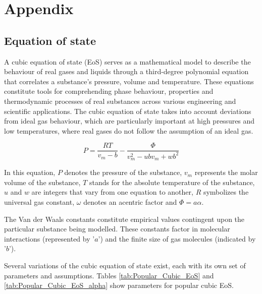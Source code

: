 \documentclass[a4paper,fleqn]{cas-dc}
\begin{document}
\clearpage \appendix \label{appendix}
\section{Appendix} 

\label{CH: Thermodynamic_details}

\subsection{Equation of state} \label{subsubsec: Equation of state}

A cubic equation of state (EoS) serves as a mathematical model to describe the behaviour of real gases and liquids through a third-degree polynomial equation that correlates a substance's pressure, volume and temperature. These equations constitute tools for comprehending phase behaviour, properties and thermodynamic processes of real substances across various engineering and scientific applications. The cubic equation of state takes into account deviations from ideal gas behaviour, which are particularly important at high pressures and low temperatures, where real gases do not follow the assumption of an ideal gas.

{\footnotesize
	\begin{equation}
		P = \frac{RT}{v_m-b} - \frac{\Phi}{v_m^2 - ubv_m + wb^2}
	\end{equation}
}

In this equation, $P$ denotes the pressure of the substance, $v_m$ represents the molar volume of the substance, $T$ stands for the absolute temperature of the substance, $u$ and $w$ are integers that vary from one equation to another, $R$ symbolizes the universal gas constant, $\omega$ denotes an acentric factor and $\Phi=a\alpha$.

The Van der Waals constants constitute empirical values contingent upon the particular substance being modelled. These constants factor in molecular interactions (represented by '$a$') and the finite size of gas molecules (indicated by '$b$'). 

Several variations of the cubic equation of state exist, each with its own set of parameters and assumptions. Tables \ref{tab:Popular_Cubic_EoS} and \ref{tab:Popular_Cubic_EoS_alpha} show parameters for popular cubic EoS.
\end{document}
